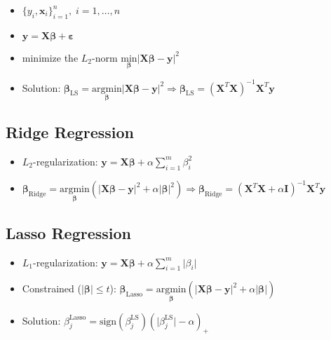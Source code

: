 \documentclass[11pt]{article}
\begin{document}
\begin{itemize}
    \item $\{y_i, \boldsymbol{x}_i\}_{i=1}^n,\; i=1,\dots,n$
    \item $\boldsymbol{y} = \boldsymbol{X}\boldsymbol{\beta} + \boldsymbol{\varepsilon}$
    \item minimize the \(L_2\)-norm $\underset{\boldsymbol{\beta}}{\text{min}}{\big|}\boldsymbol{X}\boldsymbol{\beta} - \boldsymbol{y}{\big|}^2$
    \item Solution: $\boldsymbol{\beta}_{\text{LS}} = \underset{\boldsymbol{\beta}}{\text{arg}\text{min}}{\big|}\boldsymbol{X}\boldsymbol{\beta} - \boldsymbol{y}{\big|}^2 \Rightarrow \boldsymbol{\beta}_{\text{LS}} = \left(\boldsymbol{X}^T\boldsymbol{X}\right)^{-1}\boldsymbol{X}^T\boldsymbol{y}$
\end{itemize}

\hypertarget{ridge-regression}{%
\subsection*{Ridge Regression}\label{ridge-regression}}

\begin{itemize}
    \item $L_2$-regularization: $\boldsymbol{y} = \boldsymbol{X}\boldsymbol{\beta} + \alpha\sum\limits_{i=1}^m\beta^2_i$
    \item $\boldsymbol{\beta}_{\text{Ridge}} = \underset{\boldsymbol{\beta}}{\text{arg}\text{min}}\left({\big|}\boldsymbol{X}\boldsymbol{\beta} - \boldsymbol{y}{\big|}^2 + \alpha{\big|}\boldsymbol{\beta}{\big|}^2\right) \Rightarrow \boldsymbol{\beta}_{\text{Ridge}} = \left(\boldsymbol{X}^T\boldsymbol{X} + \alpha \boldsymbol{I}\right)^{-1}\boldsymbol{X}^T\boldsymbol{y}$
\end{itemize}

\hypertarget{lasso-regression}{%
\subsection*{Lasso Regression}\label{lasso-regression}}

\begin{itemize}
    \item $L_1$-regularization: $\boldsymbol{y} = \boldsymbol{X}\boldsymbol{\beta} + \alpha\sum\limits_{i=1}^m{\big|}\beta_i{\big|}$
    \item Constrained ($|\boldsymbol{\beta}|\leq t$): $\boldsymbol{\beta}_{\text{Lasso}} = \underset{\boldsymbol{\beta}}{\text{arg}\text{min}}\left({\big|}\boldsymbol{X}\boldsymbol{\beta} - \boldsymbol{y}{\big|}^2 + \alpha{\big|}\boldsymbol{\beta}{\big|}\right)$
    \item Solution: $\beta^{\text{Lasso}}_j = \text{sign}\left(\beta^{\text{LS}}_j\right)\left({\big|}\beta^{\text{LS}}_j{\big|} - \alpha\right)_+$
\end{itemize}
\end{document}
